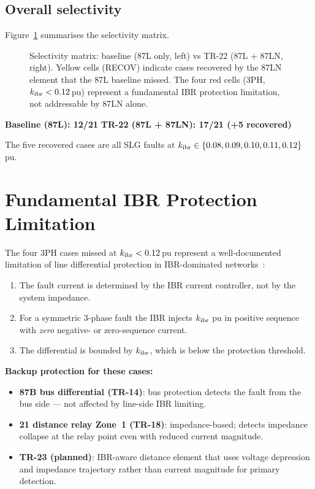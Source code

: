 \documentclass[11pt, a4paper]{article}
\begin{document}
\subsection{Overall selectivity}

Figure~\ref{fig:matrix} summarises the selectivity matrix.

\begin{figure}[h]
  \centering
  \resizebox{\textwidth}{!}{}
  \caption{Selectivity matrix: baseline (87L only, left) vs TR-22
           (87L $+$ 87LN, right).  Yellow cells (RECOV) indicate cases
           recovered by the 87LN element that the 87L baseline missed.
           The four red cells (3PH, $k_{\rm ibr} < 0.12$\,pu) represent a
           fundamental IBR protection limitation, not addressable by
           87LN alone.}
  \label{fig:matrix}
\end{figure}

\begin{center}
  \large
  \textbf{Baseline (87L): 12/21} \qquad
  \textbf{\textcolor{okgreen}{TR-22 (87L + 87LN): 17/21 (+5 recovered)}}
\end{center}

The five recovered cases are all SLG faults at $k_{\rm ibr} \in
\{0.08, 0.09, 0.10, 0.11, 0.12\}$\,pu.


\section{Fundamental IBR Protection Limitation}
\label{sec:limitation}

The four 3PH cases missed at $k_{\rm ibr} < 0.12$\,pu represent a
well-documented limitation of line differential protection in
IBR-dominated networks~\cite{Hooshyar2019,Plet2011}:
\begin{enumerate}
  \item The fault current is determined by the IBR current controller,
        not by the system impedance.
  \item For a symmetric 3-phase fault the IBR injects $k_{\rm ibr}$ pu
        in positive sequence with \emph{zero} negative- or zero-sequence
        current.
  \item The differential is bounded by $k_{\rm ibr}$, which is below
        the protection threshold.
\end{enumerate}

\noindent \textbf{Backup protection for these cases:}
\begin{itemize}
  \item \textbf{87B bus differential (TR-14)}: bus protection detects the
        fault from the bus side — not affected by line-side IBR limiting.
  \item \textbf{21 distance relay Zone~1 (TR-18)}: impedance-based;
        detects impedance collapse at the relay point even with reduced
        current magnitude.
  \item \textbf{TR-23 (planned)}: IBR-aware distance element that uses
        voltage depression and impedance trajectory rather than current
        magnitude for primary detection.
\end{itemize}
\end{document}
